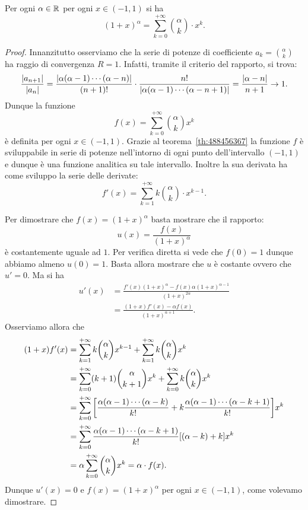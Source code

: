 \begin{theorem}
\label{th:serie_binomiale}%
%
Per ogni $\alpha\in {\mathbb R}$ per ogni $x\in (-1,1)$ si ha
\[
  (1+x)^{\alpha}  = \sum_{k=0}^{+\infty} {\alpha \choose k} \cdot x^k.
\]
\end{theorem}
%
\begin{proof}
Innanzitutto osserviamo che la serie di potenze di coefficiente
$a_k = {\alpha \choose k}$ ha raggio di convergenza $R=1$.
Infatti, tramite il criterio del rapporto, si trova:
\[
  \frac{{\left|a_{n+1}\right|}}{{\left|a_n\right|}}
  = \frac{{\left|\alpha (\alpha-1) \cdots (\alpha-n)\right|}}{(n+1)!}
  \cdot \frac{n!}{{\left|\alpha(\alpha-1) \cdots (\alpha-n+1)\right|}}
  = \frac{{\left|\alpha-n\right|}}{n+1} \to 1.
\]
Dunque la funzione
\[
 f(x) = \sum_{k=0}^{+\infty} {\alpha \choose k} x^k
\]
è definita per ogni $x\in(-1,1)$.
Grazie al teorema~\ref{th:488456367} la funzione $f$ è sviluppabile
in serie di potenze nell'intorno di ogni punto dell'intervallo $(-1,1)$
e dunque è una funzione analitica su tale intervallo. Inoltre la sua
derivata ha come sviluppo la serie delle derivate:
\[
  f'(x) = \sum_{k=1}^{+\infty} k {\alpha \choose k} \cdot x^{k-1}.
\]

Per dimostrare che $f(x) = (1+x)^\alpha$ basta mostrare che il rapporto:
\[
  u(x) = \frac{f(x)}{(1+x)^\alpha}
\]
è costantemente uguale ad $1$. Per verifica diretta si vede che $f(0)=1$
dunque abbiamo almeno $u(0) = 1$. Basta allora mostrare che $u$ è costante
ovvero che $u'=0$. Ma si ha
\begin{align*}
  u'(x)
  &= \frac{f'(x) (1+x)^\alpha - f(x) \alpha (1+x)^{\alpha-1}}{(1+x)^{2\alpha}} \\
  &= \frac{(1+x) f'(x) - \alpha f(x)}{(1+x)^{\alpha+1}}.
\end{align*}
Osserviamo allora che
\begin{align*}
(1+x)f'(x)
&= \sum_{k=1}^{+\infty} k{\alpha \choose k} x^{k-1}
+ \sum_{k=1}^{+\infty} k{\alpha \choose k} x^{k}\\
&= \sum_{k=0}^{+\infty} (k+1){\alpha \choose k+1} x^k
+ \sum_{k=0}^{+\infty} k {\alpha \choose k} x^k \\
&= \sum_{k=0}^{+\infty} {\left[ \frac{\alpha(\alpha-1) \cdots (\alpha-k)}{k!}
 + k \frac{\alpha(\alpha-1)\cdots(\alpha-k+1)}{k!} \right]} x^k \\
 &= \sum_{k=0}^{+\infty} \frac{\alpha(\alpha-1)\cdots(\alpha-k+1)}{k!}{\left[ (\alpha-k)+k \right]} x^k\\
 &= \alpha \sum_{k=0}^{+\infty} {\alpha \choose k} x^k = \alpha \cdot f(x).
\end{align*}
Dunque $u'(x)=0$ e $f(x) = (1+x)^\alpha$ per ogni $x\in(-1,1)$, come
volevamo dimostrare.
\end{proof}

